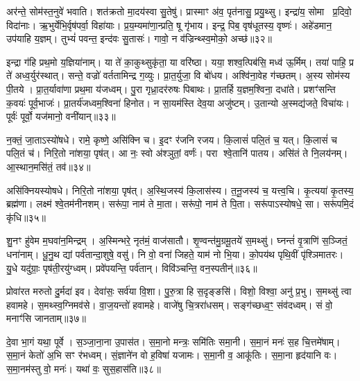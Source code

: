 अर॑न्ते॒ सोम॑स्त॒नुवे॑ भवाति।
शत॑क्रतो मा॒दय॑स्वा सु॒तेषु॑।
प्रास्माꣳ अ॑व॒ पृत॑नासु॒ प्रयु॒थ्सु।
इन्द्रा॑य॒ सोमा प्र॒दिवो॒ विदा॑नाः।
ऋ॒भुर्येभि॒र्वृष॑पर्वा॒ विहा॑याः।
प्र॒य॒म्यमा॑णा॒न्प्रति॒ षू गृ॑भाय।
इन्द्र॒ पिब॒ वृष॑धूतस्य॒ वृष्णः॑।
अहे॑डमान॒ उप॑याहि य॒ज्ञम्।
तुभ्यं॑ पवन्त॒ इन्द॑वः सु॒तासः॑।
गावो॒ न व॑ज्रिन्थ्स्व॒मोको॒ अच्छ॑॥३२॥

इन्द्रा ग॑हि प्रथ॒मो य॒ज्ञिया॑नाम्।
या ते॑ का॒कुथ्सुकृ॑ता॒ या वरि॑ष्ठा।
यया॒ शश्व॒त्पिब॑सि॒ मध्व॑ ऊ॒र्मिम्।
तया॑ पाहि॒ प्र ते॑ अध्व॒र्युर॑स्थात्।
सन्ते॒ वज्रो॑ वर्ततामिन्द्र ग॒व्युः।
प्रा॒त॒र्युजा॒ वि बो॑धय।
अश्वि॑ना॒वेह ग॑च्छतम्।
अ॒स्य सोम॑स्य पी॒तये।
प्रा॒त॒र्यावा॑णा प्रथ॒मा य॑जध्वम्।
पु॒रा गृध्रा॒दर॑रुषः पिबाथः।
प्रा॒तर्\mbox{}हि य॒ज्ञम॒श्विना॒ दधा॑ते।
प्रशꣳ॑सन्ति क॒वयः॑ पूर्व॒भाजः॑।
प्रा॒तर्य॑जध्वम॒श्विना॑ हिनोत।
न सा॒यम॑स्ति देव॒या अजु॑ष्टम्।
उ॒तान्यो अ॒स्मद्य॑जते॒ विचा॑यः।
पूर्वः॑ पूर्वो॒ यज॑मानो॒ वनी॑यान्॥३३॥\anuvakamend[चा॒श्व॒जिद्यो ग॑च्छतं नो॒ दाश॒न्नामा॑भि॒श्रीर्ग॑मेम स॒प्रथा॑ भजामहे विशन्तु या॒ह्य॑र्वाङच्छ॑ पिबाथः॒ षट्च॑]

न॒क्तं॒ जा॒ता\-ऽस्यो॑षधे।
रामे॒ कृष्णे॒ असि॑क्नि च।
इ॒दꣳ र॑जनि रजय।
कि॒लासं॑ पलि॒तं च॒ यत्।
कि॒लासं॑ च पलि॒तं च॑।
निरि॒तो ना॑शया॒ पृष॑त्।
आ नः॒ स्वो अ॑श्ञुतां॒ वर्णः॑।
परा श्वे॒तानि॑ पातय।
असि॑तं ते नि॒लय॑नम्।
आ॒स्थान॒मसि॑तं॒ तव॑॥३४॥

असि॑क्नियस्योषधे।
निरि॒तो ना॑शया॒ पृष॑त्।
अ॒स्थि॒जस्य॑ कि॒लास॑स्य।
त॒नू॒जस्य॑ च॒ यत्त्व॒चि।
कृ॒त्यया॑ कृ॒तस्य॒ ब्रह्म॑णा।
लक्ष्म॑ श्वे॒तम॑नीनशम्।
सरू॑पा॒ नाम॑ ते मा॒ता।
सरू॑पो॒ नाम॑ ते पि॒ता।
सरू॑पा\-ऽस्योषधे॒ सा।
सरू॑पमि॒दं कृ॑धि॥३५॥

शु॒नꣳ हु॑वेम म॒घवा॑न॒मिन्द्रम्।
अ॒स्मिन्भरे॒ नृत॑मं॒ वाज॑सातौ।
शृ॒ण्वन्त॑मु॒ग्रमू॒तये॑ स॒मथ्सु॑।
घ्नन्तं॑ वृ॒त्राणि॑ स॒ञ्जितं॒ धना॑नाम्।
धू॒नु॒थ द्यां पर्व॑तान्दा॒शुषे॒ वसु॑।
नि वो॒ वना॑ जिहते॒ याम॑ नो भि॒या।
को॒पय॑थ पृथि॒वीं पृ॑श्ञिमातरः।
यु॒धे यदु॑ग्राः॒ पृष॑ती॒रयु॑ग्ध्वम्।
प्रवे॑पयन्ति॒ पर्व॑तान्।
विवि॑ञ्चन्ति॒ वन॒स्पतीन्॑॥३६॥

प्रोवा॑रत मरुतो दु॒र्मदा॑ इव।
देवा॑सः॒ सर्व॑या वि॒शा।
पु॒रु॒त्रा हि स॒दृङ्ङसि॑।
विशो॒ विश्वा॒ अनु॑ प्र॒भु।
स॒मथ्सु॑ त्वा हवामहे।
स॒मथ्स्व॒ग्निमव॑से।
वा॒ज॒यन्तो॑ हवामहे।
वाजे॑षु चि॒त्ररा॑धसम्।
सङ्ग॑च्छध्व॒ꣳ॒ संव॑दध्वम्।
सं वो॒ मनाꣳ॑सि जानताम्॥३७॥

दे॒वा भा॒गं यथा॒ पूर्वे।
स॒ञ्जा॒ना॒ना उ॒पास॑त।
स॒मा॒नो मन्त्रः॒ समि॑तिः समा॒नी।
स॒मा॒नं मनः॑ स॒ह चि॒त्तमे॑षाम्।
स॒मा॒नं केतो॑ अ॒भि सꣳ र॑भध्वम्।
सं॒ज्ञाने॑न वो ह॒विषा॑ यजामः।
स॒मा॒नी व॒ आकू॑तिः।
स॒मा॒ना हृद॑यानि वः।
स॒मा॒नम॑स्तु वो॒ मनः॑।
यथा॑ वः॒ सुस॒हास॑ति॥३८॥


